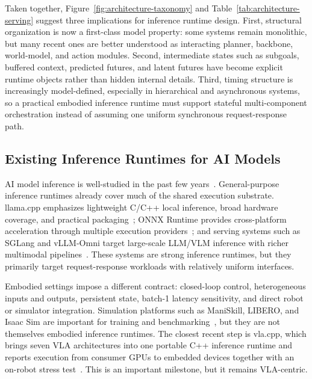 \documentclass[11pt,letterpaper,logo]{seu-paisys}
\newcommand{\llamacpp}{llama.cpp}
\newcommand{\vlacpp}{vla.cpp}
\begin{document}
Taken together, Figure~\ref{fig:architecture-taxonomy} and Table~\ref{tab:architecture-serving} suggest three implications for inference runtime design. First, structural organization is now a first-class model property: some systems remain monolithic, but many recent ones are better understood as interacting planner, backbone, world-model, and action modules. Second, intermediate states such as subgoals, buffered context, predicted futures, and latent futures have become explicit runtime objects rather than hidden internal details. Third, timing structure is increasingly model-defined, especially in hierarchical and asynchronous systems, so a practical embodied inference runtime must support stateful multi-component orchestration instead of assuming one uniform synchronous request-response path.

\subsection{Existing Inference Runtimes for AI Models}

AI model inference is well-studied in the past few years~\cite{wu2021pecam,wu2020emo,zeng2025h2o,li2024agent,li2025infscaler,li2025mobilora}.
General-purpose inference runtimes already cover much of the shared execution substrate. \llamacpp{} emphasizes lightweight C/C++ local inference, broad hardware coverage, and practical packaging~\cite{llama-cpp}; ONNX Runtime provides cross-platform acceleration through multiple execution providers~\cite{onnxruntime}; and serving systems such as SGLang and vLLM-Omni target large-scale LLM/VLM inference with richer multimodal pipelines~\cite{sglang,vllm-omni}. These systems are strong inference runtimes, but they primarily target request-response workloads with relatively uniform interfaces.

Embodied settings impose a different contract: closed-loop control, heterogeneous inputs and outputs, persistent state, batch-1 latency sensitivity, and direct robot or simulator integration. Simulation platforms such as ManiSkill, LIBERO, and Isaac Sim are important for training and benchmarking~\cite{maniskill,libero,isaacsim}, but they are not themselves embodied inference runtimes. The closest recent step is \vlacpp{}, which brings seven VLA architectures into one portable C++ inference runtime and reports execution from consumer GPUs to embedded devices together with an on-robot stress test~\cite{vla-cpp}. This is an important milestone, but it remains VLA-centric.
\end{document}
